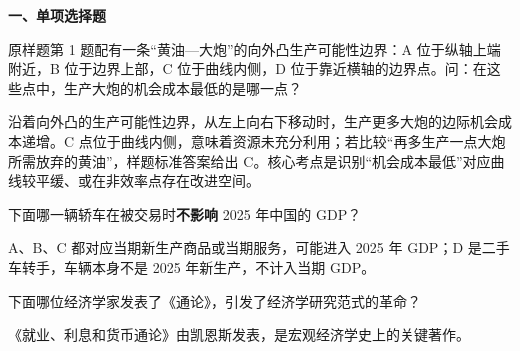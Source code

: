 ﻿


\textbf{一、单项选择题}

\begin{question}
原样题第 1 题配有一条“黄油—大炮”的向外凸生产可能性边界：A 位于纵轴上端附近，B 位于边界上部，C 位于曲线内侧，D 位于靠近横轴的边界点。问：在这些点中，生产大炮的机会成本最低的是哪一点？
\begin{choiceoptions}[2]
\end{choiceoptions}
\begin{solution}
沿着向外凸的生产可能性边界，从左上向右下移动时，生产更多大炮的边际机会成本递增。C 点位于曲线内侧，意味着资源未充分利用；若比较“再多生产一点大炮所需放弃的黄油”，样题标准答案给出 C。核心考点是识别“机会成本最低”对应曲线较平缓、或在非效率点存在改进空间。
\end{solution}
\end{question}

\begin{question}
下面哪一辆轿车在被交易时\textbf{不影响} 2025 年中国的 GDP？
\begin{choiceoptions}[1]
\end{choiceoptions}
\begin{solution}
A、B、C 都对应当期新生产商品或当期服务，可能进入 2025 年 GDP；D 是二手车转手，车辆本身不是 2025 年新生产，不计入当期 GDP。
\end{solution}
\end{question}

\begin{question}
下面哪位经济学家发表了《通论》，引发了经济学研究范式的革命？
\begin{choiceoptions}[2]
\end{choiceoptions}
\begin{solution}
《就业、利息和货币通论》由凯恩斯发表，是宏观经济学史上的关键著作。
\end{solution}
\end{question}

